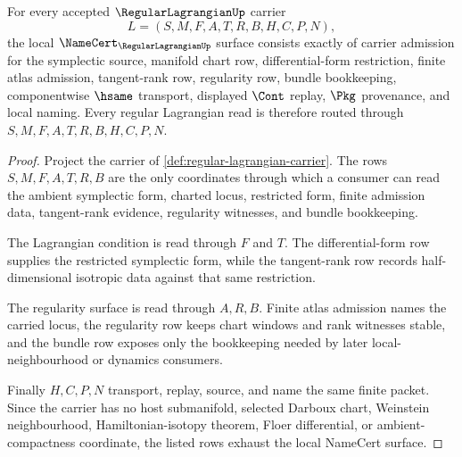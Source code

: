 \begin{theorem}
\label{thm:regular-lagrangian-namecert-obligations}
For every accepted $\RegularLagrangianUp$ carrier
$$
L=(S,M,F,A,T,R,B,H,C,P,N),
$$
the local $\NameCert_{\RegularLagrangianUp}$ surface consists exactly of carrier admission for the symplectic source, manifold chart row, differential-form restriction, finite atlas admission, tangent-rank row, regularity row, bundle bookkeeping, componentwise $\hsame$ transport, displayed $\Cont$ replay, $\Pkg$ provenance, and local naming. Every regular Lagrangian read is therefore routed through $S,M,F,A,T,R,B,H,C,P,N$.
\end{theorem}
\begin{proof}
Project the carrier of \autoref{def:regular-lagrangian-carrier}. The rows $S,M,F,A,T,R,B$ are the only coordinates through which a consumer can read the ambient symplectic form, charted locus, restricted form, finite admission data, tangent-rank evidence, regularity witnesses, and bundle bookkeeping.

The Lagrangian condition is read through $F$ and $T$. The differential-form row supplies the restricted symplectic form, while the tangent-rank row records half-dimensional isotropic data against that same restriction.

The regularity surface is read through $A,R,B$. Finite atlas admission names the carried locus, the regularity row keeps chart windows and rank witnesses stable, and the bundle row exposes only the bookkeeping needed by later local-neighbourhood or dynamics consumers.

Finally $H,C,P,N$ transport, replay, source, and name the same finite packet. Since the carrier has no host submanifold, selected Darboux chart, Weinstein neighbourhood, Hamiltonian-isotopy theorem, Floer differential, or ambient-compactness coordinate, the listed rows exhaust the local NameCert surface.
\end{proof}

